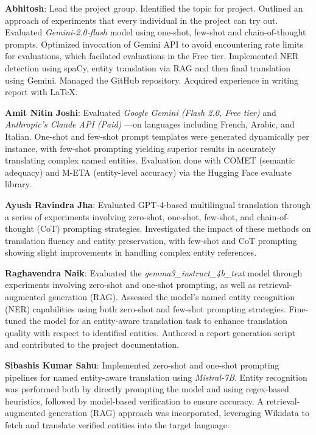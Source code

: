\documentclass[final]{ecai}
\begin{document}
\textbf{Abhitosh}: Lead the project group. Identified the topic for project. Outlined an approach of experiments that every individual in the project can try out.
Evaluated \textit{Gemini-2.0-flash} model using one-shot, few-shot and chain-of-thought prompts. Optimized invocation of Gemini API to avoid encountering 
rate limits for evaluations, which facilated evaluations in the Free tier. 
Implemented NER detection using spaCy, entity translation via RAG and 
then final translation using Gemini. Managed the GitHub repository. Acquired experience in writing report with LaTeX.

\textbf{Amit Nitin Joshi}: Evaluated \textit{Google Gemini (Flash 2.0, Free tier)} and \textit{Anthropic’s Claude API (Paid)} —on languages
including French, Arabic, and Italian. One-shot and few-shot prompt templates were generated dynamically per instance,
with few-shot prompting yielding superior results in accurately translating complex named entities. 
Evaluation done with COMET (semantic adequacy) and M-ETA (entity-level accuracy) via the Hugging Face evaluate library.

\textbf{Ayush Ravindra Jha}: Evaluated GPT-4-based multilingual translation through a series of experiments involving zero-shot,
one-shot, few-shot, and chain-of-thought (CoT) prompting strategies. Investigated the impact of these methods on translation fluency 
and entity preservation, with few-shot and CoT prompting showing slight improvements in handling complex entity references.

\textbf{Raghavendra Naik}: Evaluated the \textit{gemma3\_instruct\_4b\_text} model through experiments 
involving zero-shot and one-shot prompting, as well as retrieval-augmented generation (RAG). 
Assessed the model's named entity recognition (NER) capabilities using both zero-shot and few-shot prompting
strategies. Fine-tuned the model for an entity-aware translation task to enhance translation quality with 
respect to identified entities. Authored a report generation script and contributed to the project 
documentation.

\textbf{Sibashis Kumar Sahu}: Implemented zero-shot and one-shot prompting pipelines for 
named entity-aware translation using \textit{Mistral-7B}. Entity recognition was performed both by directly 
prompting the model and using regex-based heuristics, followed by model-based verification to ensure accuracy.
A retrieval-augmented generation (RAG) approach was incorporated, leveraging Wikidata to fetch and translate 
verified entities into the target language.
\end{document}
